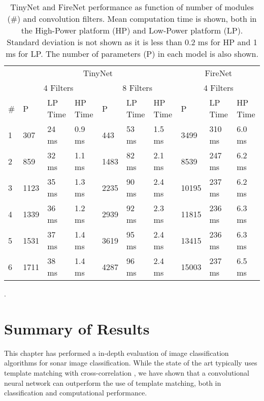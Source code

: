 \begin{table*}[t]
    \forcerectofloat
	\centering
	\begin{tabular}{llllllllll}
		\hline
		& \multicolumn{6}{c}{TinyNet} & \multicolumn{3}{c}{FireNet}\\
		& \multicolumn{3}{c}{4 Filters} & \multicolumn{3}{c}{8 Filters} & \multicolumn{3}{c}{4 Filters}\\
		\#   	& P & LP Time & HP Time & P & LP Time & HP Time & P & LP Time & HP Time\\
		\hline 
		1 		& 307 	 & 24 ms & 0.9 ms & 443  & 53 ms  & 1.5 ms & 3499   & 310 ms & 6.0 ms\\ 
		2  		& 859    & 32 ms & 1.1 ms & 1483 & 82 ms  & 2.1 ms & 8539   & 247 ms & 6.2 ms\\ 
		3 		& 1123   & 35 ms & 1.3 ms & 2235 & 90 ms  & 2.4 ms & 10195  & 237 ms & 6.2 ms\\
		4 		& 1339	 & 36 ms & 1.2 ms & 2939 & 92 ms  & 2.3 ms & 11815  & 236 ms & 6.3 ms\\
		5 		& 1531   & 37 ms & 1.4 ms & 3619 & 95 ms  & 2.4 ms & 13415  & 236 ms & 6.3 ms\\
		6 		& 1711   & 38 ms & 1.4 ms & 4287 & 96 ms  & 2.4 ms & 15003  & 237 ms & 6.5 ms\\
		\hline 
	\end{tabular}
	\vspace*{0.5cm}
	\caption[TinyNet and FireNet performance as function of number of modules and convolution filters]{TinyNet and FireNet performance as function of number of modules (\#) and convolution filters. Mean computation time is shown, both in the High-Power platform (HP) and Low-Power platform (LP). Standard deviation is not shown as it is less than 0.2 ms for HP and 1 ms for LP. The number of parameters (P) in each model is also shown.}
	\label{sic:tinyFireNetPerformanceVsModules}. 
\end{table*}

\newpage
\section{Summary of Results}

This chapter has performed a in-depth evaluation of image classification algorithms for sonar image classification. While the state of the art typically uses template matching with cross-correlation \cite[4em]{hurtos2013automatic}, we have shown that a convolutional neural network can outperform the use of template matching, both in classification and computational performance.

